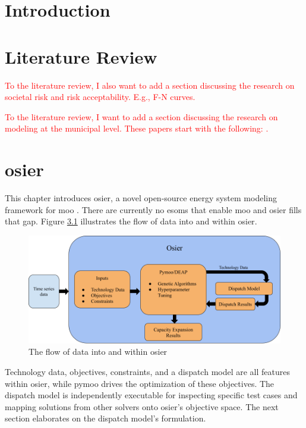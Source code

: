\chapter{Introduction}
\chapter{Literature Review}

\textcolor{red}{To the literature review, I also want to add a section 
discussing the research on societal risk and risk acceptability. E.g., F-N
curves.}

\textcolor{red}{To the literature review, I want to add a section discussing 
the research on modeling at the municipal level. These papers start with the 
following: 
\cite{mckenna_combining_2018,johannsen_municipal_2023,ben_amer_too_2020}.}

\chapter{\acf{osier}}
\label{chapter:osier}

This chapter introduces \acf{osier}, a novel open-source energy system modeling
framework for \acl{moo} \cite{dotson_osier_nodate}. There are currently no
\acp{esom} that enable \ac{moo} and \ac{osier} fills that gap. Figure
\ref{fig:osier_flow} illustrates the flow of data into and within \ac{osier}.

\begin{figure}[H]
    \centering
    \includegraphics[width=\columnwidth]{figures/osier_flow}
    \caption{The flow of data into and within \ac{osier}}
    \label{fig:osier_flow}
\end{figure}

Technology data, objectives, constraints, and a dispatch model are all features
within \ac{osier}, while \ac{pymoo} drives the optimization of these objectives.
The dispatch model is independently executable for inspecting specific test
cases and mapping solutions from other solvers onto \ac{osier}'s objective
space. The next section elaborates on the dispatch model's formulation.

